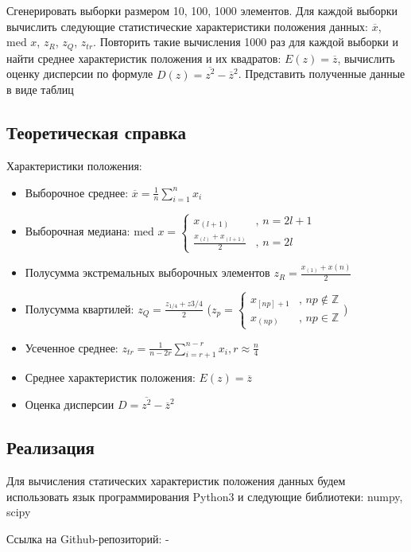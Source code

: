 \documentclass[14pt]{extarticle}
\begin{document}
Сгенерировать выборки размером 10, 100, 1000 элементов. Для каждой выборки вычислить следующие статистические характеристики положения данных: \(\overline{x}\), \(\text{med }x\), \(z_R\), \(z_Q\), \(z_{tr}\). Повторить такие вычисления 1000 раз для каждой выборки и найти среднее характеристик положения и их квадратов: \(E(z)=\overline{z}\), вычислить оценку дисперсии по формуле \(D(z)=\overline{z^2}-\overline{z}^2\). Представить полученные данные в виде таблиц

\subsection{Теоретическая справка}

Характеристики положения:
\begin{itemize}
    \item Выборочное среднее: \(\overline{x} = \frac{1}{n}\sum_{i=1}^n x_i\)
    \item Выборочная медиана: \(\text{med } x = \begin{cases}
    x_{(l+1)}&\text{, } n=2l+1 \\
    \frac{x_{(l)}+x_{(l+1)}}{2}&\text{, } n=2l\end{cases}\)
    \item Полусумма экстремальных выборочных элементов \(z_R=\frac{x_{(1)}+x{(n)}}{2}\)
    \item Полусумма квартилей: \(z_Q=\frac{z_{1/4}+z{3/4}}{2}\) (\(z_p=\begin{cases}
    x_{[np]+1}&\text{, } np\notin\mathbb{Z} \\
    x_{(np)}&\text{, } np\in\mathbb{Z}\end{cases}\))
    \item Усеченное среднее: \(z_{tr}=\frac{1}{n-2r}\sum_{i=r+1}^{n-r} x_i, r\approx\frac{n}{4}\)
    \item Среднее характеристик положения: \(E(z)=\overline{z}\)
    \item Оценка дисперсии \(D=\overline{z^2}-\overline{z}^2\)
\end{itemize}

\subsection{Реализация}

Для вычисления статических характеристик положения данных будем использовать язык программирования Python3 и следующие библиотеки: numpy, scipy

Ссылка на Github-репозиторий: -
\end{document}
